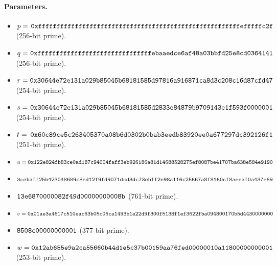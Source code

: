 \paragraph{Parameters.}

\begin{itemize}
	\item[$\bullet$] $p = \tt{\hspace{0.04cm}0xfffffffffffffffffffffffffffffffffffffffffffffffffffffffefffffc2f}$ (256-bit prime).
	\item[$\bullet$] $q = \tt{\hspace{0.01cm}0xfffffffffffffffffffffffffffffffebaaedce6af48a03bbfd25e8cd0364141}$ (256-bit prime).	
	\item[$\bullet$] $r = \tt{0x30644e72e131a029b85045b68181585d97816a916871ca8d3c208c16d87cfd47}$ (254-bit prime).
	\item[$\bullet$] $s = \tt{\hspace{0.03cm}0x30644e72e131a029b85045b68181585d2833e84879b9709143e1f593f0000001}$ (254-bit prime).
	\item[$\bullet$] $t = \tt{\hspace{0.07cm}0x60c89ce5c263405370a08b6d0302b0bab3eedb83920ee0a677297dc392126f1}$ (251-bit prime).
	\item[$\bullet$] $u = \tt{0x122e824fb83ce0ad187c94004faff3eb926186a81d14688528275ef8087be41707ba638e584e9190}$
	\item[] \hspace{0.53cm} $\tt{3cebaff25b423048689c8ed12f9fd9071dcd3dc73ebff2e98a116c25667a8f8160cf8aeeaf0a437e69}$
	\item[] \hspace{0.53cm} $\tt{13e6870000082f49d00000000008b}$ (761-bit prime).
	\item[$\bullet$] $v = \tt{0x01ae3a4617c510eac63b05c06ca1493b1a22d9f300f5138f1ef3622fba094800170b5d4430000000}$
	\item[] \hspace{0.52cm} $\tt{8508c00000000001}$ (377-bit prime).
	\item[$\bullet$] $w = \tt{0x12ab655e9a2ca55660b44d1e5c37b00159aa76fed00000010a11800000000001}$ (253-bit prime).
\end{itemize}

